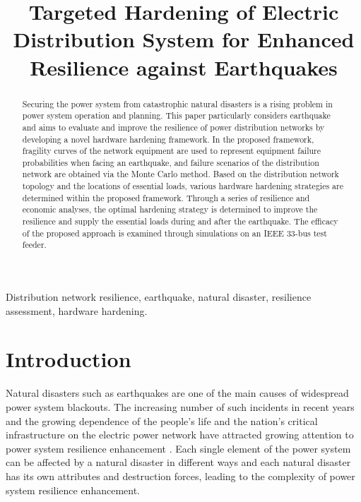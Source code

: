 \documentclass[conference]{IEEEtran}
\begin{document}
\title{Targeted Hardening of Electric Distribution System  for Enhanced Resilience against Earthquakes\\
}

\author{
}

\maketitle

\begin{abstract}
Securing the power system from catastrophic natural disasters is a rising problem in power system operation and planning. This paper particularly considers earthquake and aims to evaluate and improve the resilience of power distribution networks by developing a novel hardware hardening framework. In the proposed framework, fragility curves of the network equipment are used to represent equipment failure probabilities when facing an earthquake, and failure scenarios of the distribution network are obtained via the Monte Carlo method. Based on the distribution network topology and the locations of essential loads, various hardware hardening strategies are determined within the proposed framework. Through a series of resilience and economic analyses, the optimal hardening strategy is determined to improve the resilience and supply the essential loads during and after the earthquake. The efficacy of the proposed approach is examined through simulations on an IEEE 33-bus test feeder.
\end{abstract}

\begin{IEEEkeywords}
Distribution network resilience, earthquake, natural disaster, resilience assessment, hardware hardening.
\end{IEEEkeywords}

\section{Introduction}
Natural disasters such as earthquakes are one of the main causes of widespread power system blackouts. The increasing number of such incidents in recent years and the growing dependence of the people’s life and the nation’s critical infrastructure on the electric power network have attracted growing attention to power system resilience enhancement \cite{Panteli_theGrid_2015}. Each single element of the power system can be affected by a natural disaster in different ways and each natural disaster has its own attributes and destruction forces, leading to the complexity of power system resilience enhancement.
\end{document}
